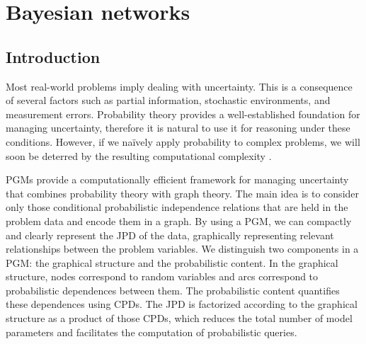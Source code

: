 %
%
%
%
%

\chapter{Bayesian networks} \label{ch:2_bayesian_networks}
\section{Introduction}
Most real-world problems imply dealing with uncertainty. This is a consequence of several factors such as partial information, stochastic environments, and measurement errors. Probability theory provides a well-established foundation for managing uncertainty, therefore it is natural to use it for reasoning under these conditions. However, if we naïvely apply probability to complex problems, we will soon be deterred by the resulting computational complexity \citep{sucar2015}.

PGMs provide a computationally efficient framework for managing uncertainty that combines probability theory with graph theory. The main idea is to consider only those conditional probabilistic independence relations that are held in the problem data and encode them in a graph. By using a PGM, we can compactly and clearly represent the JPD of the data, graphically representing relevant relationships between the problem variables. We distinguish two components in a PGM: the graphical structure and the probabilistic content. In the graphical structure, nodes correspond to random variables and arcs correspond to probabilistic dependences between them. The probabilistic content quantifies these dependences using CPDs. The JPD is factorized according to the graphical structure as a product of those CPDs, which reduces the total number of model parameters and facilitates the computation of probabilistic queries.

